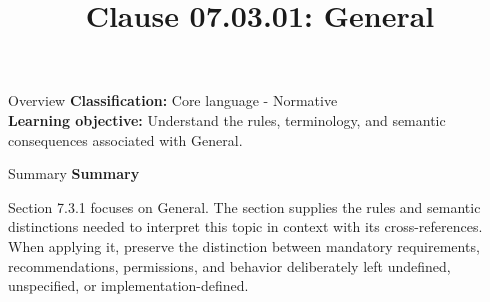 \documentclass[10pt,letterpaper]{article}
\title{Clause 07.03.01: General}
\author{}
\date{}
\begin{document}
\maketitle
\begin{CornellOverviewBox}{Overview}
\textbf{Classification:} Core language - Normative\\[2pt]
\textbf{Learning objective:} Understand the rules, terminology, and semantic consequences associated with General.
\end{CornellOverviewBox}\begin{CornellSummaryBox}{Summary}
{\sffamily\bfseries\color{Accent} Summary}\par\vspace{3pt}Section 7.3.1 focuses on General. The section supplies the rules and semantic distinctions needed to interpret this topic in context with its cross-references. When applying it, preserve the distinction between mandatory requirements, recommendations, permissions, and behavior deliberately left undefined, unspecified, or implementation-defined.
\end{CornellSummaryBox}
\end{document}
